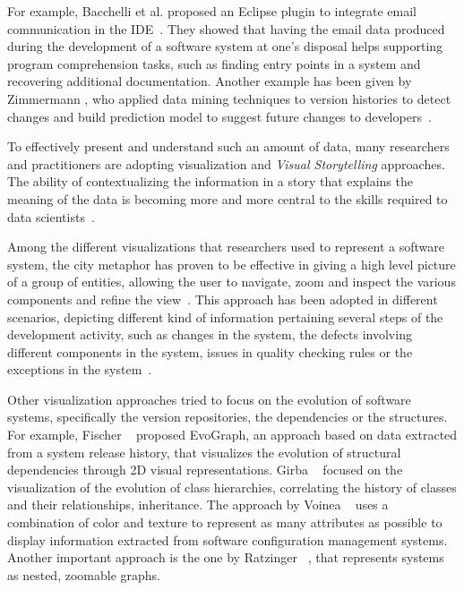 For example, Bacchelli et al.
proposed an Eclipse plugin to integrate email communication in the IDE~\cite{Bacc2011a}.
They showed that having the email data produced during the development of a software system at one's disposal helps supporting program comprehension tasks, such as finding entry points in a system and recovering additional documentation.
Another example has been given by Zimmermann \etal, who applied data mining techniques to version histories to detect changes and build prediction model to suggest future changes to developers~\cite{Zimm2004a}.

To effectively present and understand such an amount of data, many researchers and practitioners are adopting visualization and \emph{Visual Storytelling} approaches.
The ability of contextualizing the information in a story that explains the meaning of the data is becoming more and more central to the skills required to data scientists~\cite{Segel2010a}.

Among the different visualizations that researchers used to represent a software system, the city metaphor has proven to be effective in giving a high level picture of a group of entities, allowing the user to navigate, zoom and inspect the various components and refine the view~\cite{Wett2011a}.
This approach has been adopted in different scenarios, depicting different kind of information pertaining several steps of the development activity, such as changes in the system, the defects involving different components in the system, issues in quality checking rules or the exceptions in the system~\cite{Panas2003a}.

Other visualization approaches tried to focus on the evolution of software systems, specifically the version repositories, the dependencies or the structures.
For example, Fischer \etal~\cite{Fisch2006a} proposed EvoGraph, an approach based on data extracted from a system release history, that visualizes the evolution of structural dependencies through 2D visual representations.
Girba \etal~\cite{Girb2005a} focused on the visualization of the evolution of class hierarchies, correlating the history of classes and their relationships, \eg inheritance.
The approach by Voinea \etal~\cite{Voin2007a} uses a combination of color and texture to represent as many attributes as possible to display information extracted from software configuration management systems.
Another important approach is the one by Ratzinger \etal~\cite{Ratz2005a}, that represents systems as nested, zoomable graphs.

